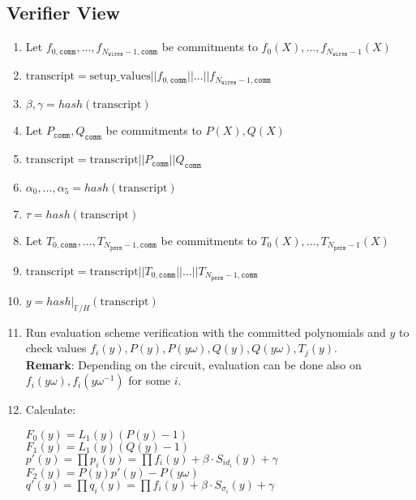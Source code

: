 \subsection{Verifier View}

\begin{enumerate}
    \item Let $f_{0, \texttt{comm}}, \dots, f_{N_{\texttt{wires}} - 1, \texttt{comm}}$ be commitments to $f_{0}(X), \dots, f_{N_{\texttt{wires}} - 1}(X)$
    \item $\text{transcript} = \text{setup\_values} || f_{0, \texttt{comm}} || \dots || f_{N_{\texttt{wires}} - 1, \texttt{comm}}$
    \item $\beta, \gamma = hash(\text{transcript})$
    \item Let $P_{\texttt{comm}}, Q_{\texttt{comm}}$ be commitments to $P(X), Q(X)$
    \item $\text{transcript} = \text{transcript} || P_{\texttt{comm}} || Q_{\texttt{comm}}$
    \item $\alpha_0, \dots, \alpha_5 = hash(\text{transcript})$
    \item $\tau = hash(\text{transcript})$
    \item Let $T_{0, \texttt{comm}}, ..., T_{N_{\texttt{perm}} - 1, \texttt{comm}}$ be commitments to $T_0(X), ..., T_{N_{\texttt{perm}} - 1}(X)$
    \item $\text{transcript} = \text{transcript} || T_{0, \texttt{comm}} || ... || T_{N_{\texttt{perm}} - 1, \texttt{comm}}$
    \item $y = hash|_{\mathbb{F}/H}(\text{transcript})$
    \item Run evaluation scheme verification with the committed polynomials and $y$ to check values
    $f_i(y), P(y), P(y\omega), Q(y), Q(y\omega), T_j(y)$.  \\
    \textbf{Remark}: Depending on the circuit, evaluation can be done also on $f_i(y\omega), f_i(y\omega^{-1})$ for some $i$.
    \item Calculate:
    \begin{center}
        $F_0(y) = L_1(y)(P(y) - 1)$ \\
        $F_1(y) = L_1(y)(Q(y) - 1)$ \\
        $p'(y) = \prod p_i(y) = \prod f_i(y) + \beta \cdot S_{id_i}(y) + \gamma$ \\
        $F_2(y) = P(y)p'(y) - P(y\omega)$ \\
        $q'(y) = \prod q_i(y) = \prod f_i(y) + \beta \cdot S_{\sigma_i}(y) + \gamma$ \\

\end{center}
\end{enumerate}
